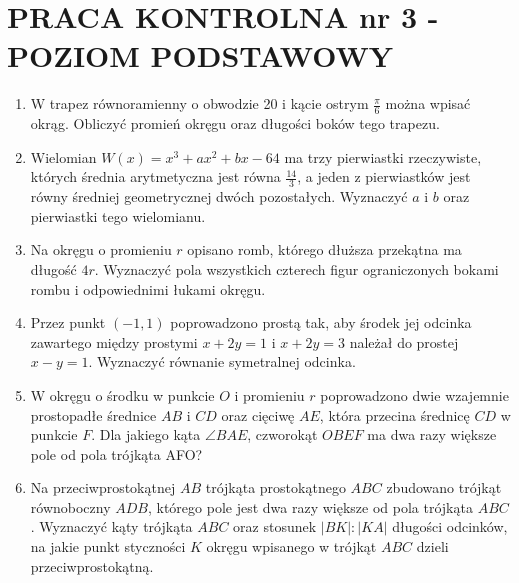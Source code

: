\documentclass[10pt]{article}
\begin{document}
\section*{PRACA KONTROLNA nr 3 - POZIOM PODSTAWOWY}
\begin{enumerate}
  \item W trapez równoramienny o obwodzie 20 i kącie ostrym $\frac{\pi}{6}$ można wpisać okrąg. Obliczyć promień okręgu oraz długości boków tego trapezu.
  \item Wielomian $W(x)=x^{3}+a x^{2}+b x-64$ ma trzy pierwiastki rzeczywiste, których średnia arytmetyczna jest równa $\frac{14}{3}$, a jeden z pierwiastków jest równy średniej geometrycznej dwóch pozostałych. Wyznaczyć $a$ i $b$ oraz pierwiastki tego wielomianu.
  \item Na okręgu o promieniu $r$ opisano romb, którego dłuższa przekątna ma długość $4 r$. Wyznaczyć pola wszystkich czterech figur ograniczonych bokami rombu i odpowiednimi łukami okręgu.
  \item Przez punkt $(-1,1)$ poprowadzono prostą tak, aby środek jej odcinka zawartego między prostymi $x+2 y=1$ i $x+2 y=3$ należał do prostej $x-y=1$. Wyznaczyć równanie symetralnej odcinka.
  \item W okręgu o środku w punkcie $O$ i promieniu $r$ poprowadzono dwie wzajemnie prostopadłe średnice $A B$ i $C D$ oraz cięciwę $A E$, która przecina średnicę $C D$ w punkcie $F$. Dla jakiego kąta $\angle B A E$, czworokąt $O B E F$ ma dwa razy większe pole od pola trójkąta AFO?
  \item Na przeciwprostokątnej $A B$ trójkąta prostokątnego $A B C$ zbudowano trójkąt równoboczny $A D B$, którego pole jest dwa razy większe od pola trójkąta $A B C$. Wyznaczyć kąty trójkąta $A B C$ oraz stosunek $|B K|:|K A|$ długości odcinków, na jakie punkt styczności $K$ okręgu wpisanego w trójkąt $A B C$ dzieli przeciwprostokątną.
\end{enumerate}
\end{document}
